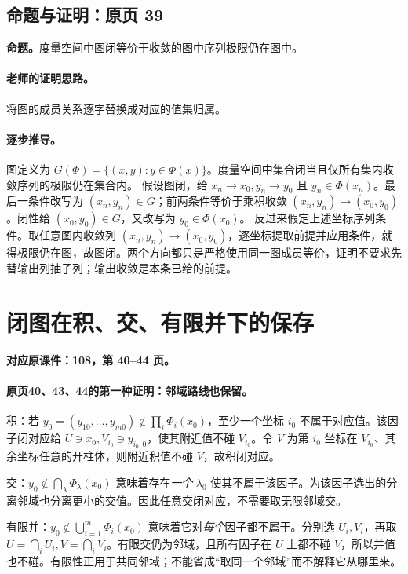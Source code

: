 \subsection{命题与证明：原页 39}

\textbf{命题。}度量空间中图闭等价于收敛的图中序列极限仍在图中。

\paragraph{老师的证明思路。}将图的成员关系逐字替换成对应的值集归属。

\paragraph{逐步推导。}
图定义为 $G(\Phi)=\{(x,y):y\in\Phi(x)\}$。度量空间中集合闭当且仅所有集内收敛序列的极限仍在集合内。
假设图闭，给 $x_n\to x_0,y_n\to y_0$ 且 $y_n\in\Phi(x_n)$。最后一条件改写为 $(x_n,y_n)\in G$；前两条件等价于乘积收敛 $(x_n,y_n)\to(x_0,y_0)$。闭性给 $(x_0,y_0)\in G$，又改写为 $y_0\in\Phi(x_0)$。
反过来假定上述坐标序列条件。取任意图内收敛列 $(x_n,y_n)\to(x_0,y_0)$，逐坐标提取前提并应用条件，就得极限仍在图，故图闭。两个方向都只是严格使用同一图成员等价，证明不要求先替输出列抽子列；输出收敛是本条已给的前提。


\clearpage\section{闭图在积、交、有限并下的保存}\label{g:108:40}

\textbf{对应原课件：108，第 40--44 页。}


\paragraph{原页40、43、44的第一种证明：邻域路线也保留。}
积：若 $y_0=(y_{10},\ldots,y_{m0})\notin\prod_i\Phi_i(x_0)$，至少一个坐标 $i_0$ 不属于对应值。该因子闭对应给 $U\ni x_0,V_{i_0}\ni y_{i_0,0}$，使其附近值不碰 $V_{i_0}$。令 $V$ 为第 $i_0$ 坐标在 $V_{i_0}$、其余坐标任意的开柱体，则附近积值不碰 $V$，故积闭对应。

交：$y_0\notin\bigcap_\lambda\Phi_\lambda(x_0)$ 意味着存在\emph{一个} $\lambda_0$ 使其不属于该因子。为该因子选出的分离邻域也分离更小的交值。因此任意交闭对应，不需要取无限邻域交。

有限并：$y_0\notin\bigcup_{i=1}^m\Phi_i(x_0)$ 意味着它对\emph{每个}因子都不属于。分别选 $U_i,V_i$，再取 $U=\bigcap_iU_i,V=\bigcap_iV_i$。有限交仍为邻域，且所有因子在 $U$ 上都不碰 $V$，所以并值也不碰。有限性正用于共同邻域；不能省成“取同一个邻域”而不解释它从哪里来。

